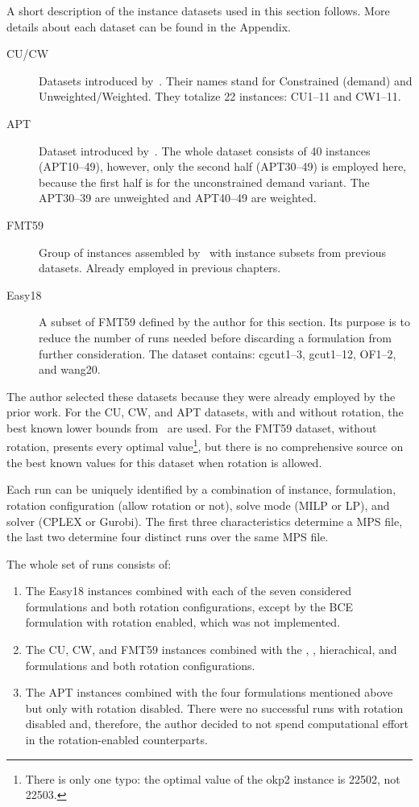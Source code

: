 A short description of the instance datasets used in this section follows.
More details about each dataset can be found in the Appendix.

\begin{description}
	\item [CU/CW] Datasets introduced by~\citet{fayard:1998}. Their names stand for Constrained (demand) and Unweighted/Weighted. They totalize 22 instances: CU1--11 and CW1--11.
	\item [APT] Dataset introduced by~\citet{alvarez:2002:tabu}. The whole dataset consists of 40 instances (APT10--49), however, only the second half (APT30--49) is employed here, because the first half is for the unconstrained demand variant. The APT30--39 are unweighted and APT40--49 are weighted.
	\item [FMT59] Group of instances assembled by~\cite{furini:2016} with instance subsets from previous datasets. Already employed in previous chapters.
	\item [Easy18] A subset of FMT59 defined by the author for this section. Its purpose is to reduce the number of runs needed before discarding a formulation from further consideration. The dataset contains: cgcut1--3, gcut1--12, OF1--2, and wang20.
\end{description}

The author selected these datasets because they were already employed by the prior work.
For the CU, CW, and APT datasets, with and without rotation, the best known lower bounds from~\citet{velasco:2019} are used.
For the FMT59 dataset, without rotation, \citet{furini:2016} presents every optimal value\footnote{There is only one typo: the optimal value of the okp2 instance is 22502, not 22503.}, but there is no comprehensive source on the best known values for this dataset when rotation is allowed.

Each run can be uniquely identified by a combination of instance, formulation, rotation configuration (allow rotation or not), solve mode (MILP or LP), and solver (CPLEX or Gurobi).
The first three characteristics determine a MPS file, the last two determine four distinct runs over the same MPS file.

The whole set of runs consists of:
\begin{enumerate}
\item The Easy18 instances combined with each of the seven considered formulations and both rotation configurations, except by the BCE formulation with rotation enabled, which was not implemented.
\item The CU, CW, and FMT59 instances combined with the {\modelBecker}, {\modelOrigami}, hierachical, and {\modelImplicit} formulations and both rotation configurations.
\item The APT instances combined with the four formulations mentioned above but only with rotation disabled. There were no successful runs with rotation disabled and, therefore, the author decided to not spend computational effort in the rotation-enabled counterparts. %
\end{enumerate}

